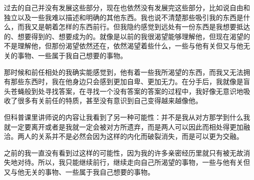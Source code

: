 过去的自己并没有发展这些部分，现在也依然没有发展完这些部分，比如说自由和独立以及一些我难以描述和明确的其他东西。我也说不清楚那些吸引我的东西是什么，而我又是朝着怎样的东西前行。但我隐约感觉到远处有一份东西是我想要抵达的、想要得到的、想要成为的。就像是以前的我很渴望能够理解他，但现在渴望的不是理解他，但那份渴望依然还在，依然渴望着些什么，一些与他有关但又与他无关的事物、一些属于我自己想要的事物。

那时候和前任相处的我确实能感觉到，他有着一些我所渴望的东西，而我又无法拥有那些东西时，我在他身边只会感到更加自卑、更加无力。在分手后，我就像是盲头苍蝇般到处寻找答案，在寻找一个没有答案的答案的过程中，我好像无意识地吸收了很多有关前任的特质，甚至没有意识到自己变得越来越像他。

但科普课里讲师说的内容让我看到了另一种可能性：并不是我从对方那学到什么我就一定要离开或者是我就一定会被对方所遗弃，而是两人可以因此而相处得更加融洽。两人的关系并不是必然会因为这样的内化而破裂消失，而是可以更为交融。

之前的我一直没有看到过这样的可能性，因为我的许多亲密经历里就只有被无故消失地对待。所以，我只能继续前行，继续走向自己所渴望的事物，一些与他有关但又与他无关的事物、一些属于我自己想要的事物。

